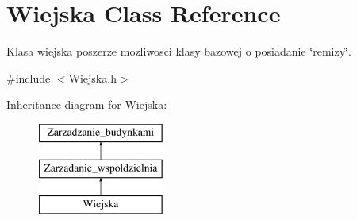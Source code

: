 \hypertarget{class_wiejska}{}\section{Wiejska Class Reference}
\label{class_wiejska}


Klasa wiejska poszerze mozliwosci klasy bazowej o posiadanie \char`\"{}remizy\char`\"{}.  




{\ttfamily \#include $<$Wiejska.\+h$>$}

Inheritance diagram for Wiejska\+:\begin{figure}[H]
\begin{center}
\leavevmode
\includegraphics[height=3.000000cm]{class_wiejska}
\end{center}
\end{figure}
